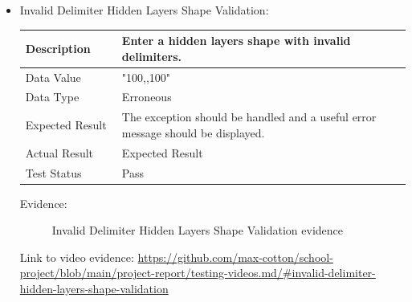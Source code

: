 \documentclass[./project-report/src/latex/project-report.tex]{subfiles}
\begin{document}
\begin{itemize}
	\pagebreak

	\item Invalid Delimiter Hidden Layers Shape Validation: \newline\newline
		\begin{tabular}{|p{0.25\linewidth}|p{0.75\linewidth}|}
			\hline
			Description & Enter a hidden layers shape with invalid delimiters. \\
			\hline
			Data Value & "100,,100" \\
			\hline
			Data Type & Erroneous \\
			\hline
			Expected Result & The exception should be handled and a useful error message should be displayed. \\
			\hline
			Actual Result & Expected Result \\
			\hline
			Test Status & Pass \\
			\hline
		\end{tabular}

		\vspace{5mm}

		Evidence:
		\begin{figure}[h!]
		\centering
		\caption{Invalid Delimiter Hidden Layers Shape Validation evidence}
		\end{figure}

		\begin{sloppypar}
		Link to video evidence: \url{https://github.com/max-cotton/school-project/blob/main/project-report/testing-videos.md/#invalid-delimiter-hidden-layers-shape-validation}
		\end{sloppypar}
\end{itemize}
\end{document}
